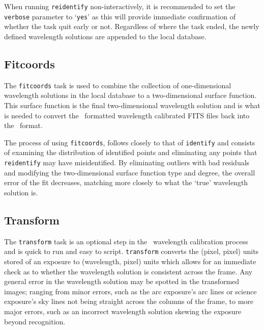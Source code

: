 When running \texttt{reidentify} non-interactively, it is recommended to set the \texttt{verbose} parameter to `\texttt{yes}' as this will provide immediate confirmation of whether the task quit early or not. Regardless of where the task ended, the newly defined wavelength solutions are appended to the local database.

\subsection{Fitcoords}

The \texttt{fitcoords} task is used to combine the collection of one-dimensional wavelength solutions in the local database to a two-dimensional surface function. This surface function is the final two-dimensional wavelength solution and is what is needed to convert the \iraf\ formatted wavelength calibrated \gls{FITS} files back into the \polsalt\ format.

The process of using \texttt{fitcoords}, follows closely to that of \texttt{identify} and consists of examining the distribution of identified points and eliminating any points that \texttt{reidentify} may have misidentified. By eliminating outliers with bad residuals and modifying the two-dimensional surface function type and degree, the overall error of the fit decreases, matching more closely to what the `true' wavelength solution is.

\subsection{Transform}

The \texttt{transform} task is an optional step in the \iraf\ wavelength calibration process and is quick to run and easy to script. \texttt{transform} converts the (pixel, pixel) units stored of an exposure to (wavelength, pixel) units which allows for an immediate check as to whether the wavelength solution is consistent across the frame. Any general error in the wavelength solution may be spotted in the transformed images; ranging from minor errors, such as the arc exposure's arc lines or science exposure's sky lines not being straight across the columns of the frame, to more major errors, such as an incorrect wavelength solution skewing the exposure beyond recognition.

